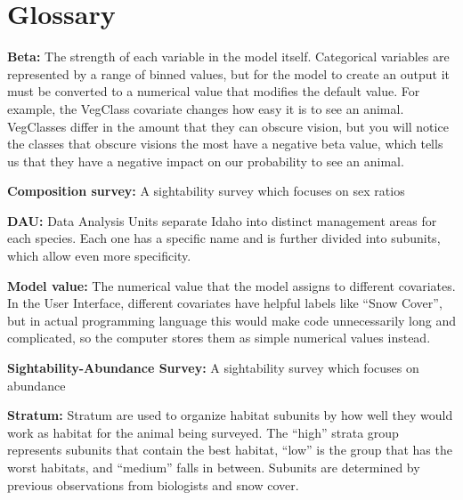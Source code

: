\documentclass[
]{book}
\begin{document}
\hypertarget{gl}{%
\chapter{Glossary}\label{gl}}

\textbf{Beta:} The strength of each variable in the model itself. Categorical variables are represented by a range of binned values, but for the model to create an output it must be converted to a numerical value that modifies the default value. For example, the VegClass covariate changes how easy it is to see an animal. VegClasses differ in the amount that they can obscure vision, but you will notice the classes that obscure visions the most have a negative beta value, which tells us that they have a negative impact on our probability to see an animal.

\textbf{Composition survey:} A sightability survey which focuses on sex ratios

\textbf{DAU:} Data Analysis Units separate Idaho into distinct management areas for each species. Each one has a specific name and is further divided into subunits, which allow even more specificity.

\textbf{Model value:} The numerical value that the model assigns to different covariates. In the User Interface, different covariates have helpful labels like ``Snow Cover'', but in actual programming language this would make code unnecessarily long and complicated, so the computer stores them as simple numerical values instead.

\textbf{Sightability-Abundance Survey:} A sightability survey which focuses on abundance

\textbf{Stratum:} Stratum are used to organize habitat subunits by how well they would work as habitat for the animal being surveyed. The ``high'' strata group represents subunits that contain the best habitat, ``low'' is the group that has the worst habitats, and ``medium'' falls in between. Subunits are determined by previous observations from biologists and snow cover.
\end{document}
